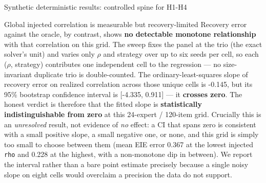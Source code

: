 \documentclass[
  ignorenonframetext,
]{beamer}
\newcounter{none} %
\begin{document}
\begin{frame}{Synthetic deterministic results:
controlled spine for H1-H4}
\begin{block}{Global injected correlation is measurable but
recovery-limited}
Recovery error against the oracle, by contrast, shows \textbf{no
detectable monotone relationship} with that correlation on this grid.
The sweep fixes the panel at the trio (the exact solver's unit) and
varies only \(\rho\) and strategy over up to six seeds per cell, so each
(\(\rho\), strategy) contributes one independent cell to the regression
--- no size-invariant duplicate trio is double-counted. The
ordinary-least-squares slope of recovery error on realized correlation
across those unique cells is -0.145, but its 95\% bootstrap confidence
interval is {[}-4.335, 0.911{]} --- it \textbf{crosses zero}. The honest
verdict is therefore that the fitted slope is \textbf{statistically
indistinguishable from zero} at this 24-expert / 120-item grid.
Crucially this is an \emph{unresolved} result, not evidence of \emph{no}
effect: a CI that spans zero is consistent with a small positive slope,
a small negative one, or none, and this grid is simply too small to
choose between them (mean EIE error 0.367 at the lowest injected
\texttt{rho} and 0.228 at the highest, with a non-monotone dip in
between). We report the interval rather than a bare point estimate
precisely because a single noisy slope on eight cells would overclaim a
precision the data do not support.


\end{block}
\end{frame}
\end{document}
